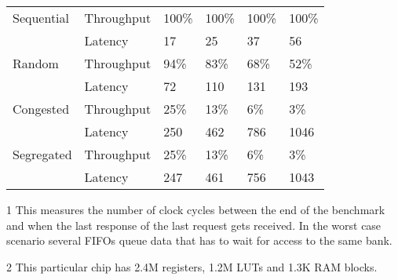 \begin{table*}
\begin{threeparttable}
\begin{tabular}{|l|l|l|l|l|l|}
\hline
Sequential & Throughput & 100\%  & 100\% & 100\% & 100\% \\
& Latency \tnote{1} & 17 & 25 & 37 & 56 \\
Random & Throughput & 94\% & 83\% & 68\% & 52\% \\
 & Latency \tnote{1} & 72 & 110 & 131 & 193 \\
Congested & Throughput & 25\% & 13\% & 6\% & 3\% \\
 & Latency \tnote{1} & 250 & 462 & 786 & 1046 \\
Segregated & Throughput & 25\% & 13\% & 6\% & 3\% \\
 & Latency \tnote{1} & 247 & 461 & 756 & 1043 \\
\hline
\end{tabular}
\begin{tablenotes}
\item[1] This measures the number of clock cycles between the end of the benchmark and when the last response of the last request gets received. In the worst case scenario several FIFOs queue data that has to wait for access to the same bank.
\item[2] This particular chip has 2.4M registers, 1.2M LUTs and 1.3K RAM blocks.
\end{tablenotes}
\end{threeparttable}
\end{table*}



